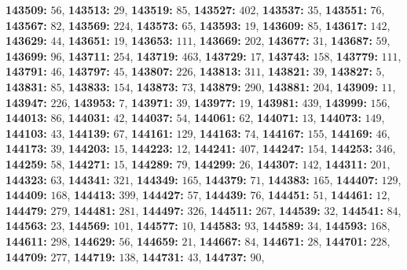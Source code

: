 \textsf{\bfseries 143509:} $56$, \textsf{\bfseries 143513:} $29$, \textsf{\bfseries 143519:} $85$, \textsf{\bfseries 143527:} $402$, \textsf{\bfseries 143537:} $35$, \textsf{\bfseries 143551:} $76$, \textsf{\bfseries 143567:} $82$, \textsf{\bfseries 143569:} $224$, \textsf{\bfseries 143573:} $65$, \textsf{\bfseries 143593:} $19$, \textsf{\bfseries 143609:} $85$, \textsf{\bfseries 143617:} $142$, \textsf{\bfseries 143629:} $44$, \textsf{\bfseries 143651:} $19$, \textsf{\bfseries 143653:} $111$, \textsf{\bfseries 143669:} $202$, \textsf{\bfseries 143677:} $31$, \textsf{\bfseries 143687:} $59$, \textsf{\bfseries 143699:} $96$, \textsf{\bfseries 143711:} $254$, \textsf{\bfseries 143719:} $463$, \textsf{\bfseries 143729:} $17$, \textsf{\bfseries 143743:} $158$, \textsf{\bfseries 143779:} $111$, \textsf{\bfseries 143791:} $46$, \textsf{\bfseries 143797:} $45$, \textsf{\bfseries 143807:} $226$, \textsf{\bfseries 143813:} $311$, \textsf{\bfseries 143821:} $39$, \textsf{\bfseries 143827:} $5$, \textsf{\bfseries 143831:} $85$, \textsf{\bfseries 143833:} $154$, \textsf{\bfseries 143873:} $73$, \textsf{\bfseries 143879:} $290$, \textsf{\bfseries 143881:} $204$, \textsf{\bfseries 143909:} $11$, \textsf{\bfseries 143947:} $226$, \textsf{\bfseries 143953:} $7$, \textsf{\bfseries 143971:} $39$, \textsf{\bfseries 143977:} $19$, \textsf{\bfseries 143981:} $439$, \textsf{\bfseries 143999:} $156$, \textsf{\bfseries 144013:} $86$, \textsf{\bfseries 144031:} $42$, \textsf{\bfseries 144037:} $54$, \textsf{\bfseries 144061:} $62$, \textsf{\bfseries 144071:} $13$, \textsf{\bfseries 144073:} $149$, \textsf{\bfseries 144103:} $43$, \textsf{\bfseries 144139:} $67$, \textsf{\bfseries 144161:} $129$, \textsf{\bfseries 144163:} $74$, \textsf{\bfseries 144167:} $155$, \textsf{\bfseries 144169:} $46$, \textsf{\bfseries 144173:} $39$, \textsf{\bfseries 144203:} $15$, \textsf{\bfseries 144223:} $12$, \textsf{\bfseries 144241:} $407$, \textsf{\bfseries 144247:} $154$, \textsf{\bfseries 144253:} $346$, \textsf{\bfseries 144259:} $58$, \textsf{\bfseries 144271:} $15$, \textsf{\bfseries 144289:} $79$, \textsf{\bfseries 144299:} $26$, \textsf{\bfseries 144307:} $142$, \textsf{\bfseries 144311:} $201$, \textsf{\bfseries 144323:} $63$, \textsf{\bfseries 144341:} $321$, \textsf{\bfseries 144349:} $165$, \textsf{\bfseries 144379:} $71$, \textsf{\bfseries 144383:} $165$, \textsf{\bfseries 144407:} $129$, \textsf{\bfseries 144409:} $168$, \textsf{\bfseries 144413:} $399$, \textsf{\bfseries 144427:} $57$, \textsf{\bfseries 144439:} $76$, \textsf{\bfseries 144451:} $51$, \textsf{\bfseries 144461:} $12$, \textsf{\bfseries 144479:} $279$, \textsf{\bfseries 144481:} $281$, \textsf{\bfseries 144497:} $326$, \textsf{\bfseries 144511:} $267$, \textsf{\bfseries 144539:} $32$, \textsf{\bfseries 144541:} $84$, \textsf{\bfseries 144563:} $23$, \textsf{\bfseries 144569:} $101$, \textsf{\bfseries 144577:} $10$, \textsf{\bfseries 144583:} $93$, \textsf{\bfseries 144589:} $34$, \textsf{\bfseries 144593:} $168$, \textsf{\bfseries 144611:} $298$, \textsf{\bfseries 144629:} $56$, \textsf{\bfseries 144659:} $21$, \textsf{\bfseries 144667:} $84$, \textsf{\bfseries 144671:} $28$, \textsf{\bfseries 144701:} $228$, \textsf{\bfseries 144709:} $277$, \textsf{\bfseries 144719:} $138$, \textsf{\bfseries 144731:} $43$, \textsf{\bfseries 144737:} $90$, 

